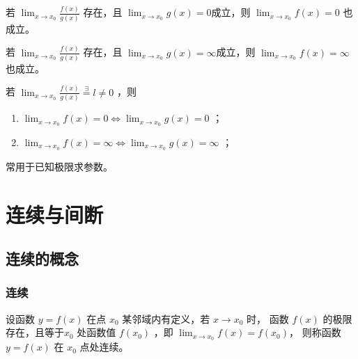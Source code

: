\begin{Field}[极限命题4]

    若 $ {\displaystyle\lim_{x\rightarrow x_0}}\frac{f(x)}{g(x)} $ 存在，且
    $ {\displaystyle\lim_{x\rightarrow x_0}}g(x)=0 $成立，则
    $ {\displaystyle\lim_{x\rightarrow x_0}}f(x)=0 $ 也成立。
\end{Field}


\begin{Field}[极限命题4推论]

    若 $ {\displaystyle\lim_{x\rightarrow x_0}}\frac{f(x)}{g(x)} $ 存在，且
    $ {\displaystyle\lim_{x\rightarrow x_0}}g(x)=\infty $成立，则
    $ {\displaystyle\lim_{x\rightarrow x_0}}f(x)=\infty $ 也成立。
\end{Field}

\begin{Field}[极限命题5]

    若 $ {\displaystyle\lim_{x\rightarrow x_0}}\frac{f(x)}{g(x)}\mathop{=}\limits^\exists l \neq 0 $ ，则
    \begin{enumerate}
        \item $ {\displaystyle\lim_{x\rightarrow x_0}}f(x)=0\Leftrightarrow {\displaystyle\lim_{x\rightarrow x_0}} g(x)=0 $ ；
        \item $ {\displaystyle\lim_{x\rightarrow x_0}}f(x)=\infty\Leftrightarrow {\displaystyle\lim_{x\rightarrow x_0}} g(x)=\infty $ ；
    \end{enumerate}
\end{Field}

常用于已知极限求参数。


\section{连续与间断}

\subsection{连续的概念}

\subsubsection{连续}

\begin{Def}[连续]

    设函数 $ y=f(x) $ 在点 $ x_0 $ 某邻域内有定义，若 $ x\rightarrow x_0 $ 时，
    函数 $ f(x) $ 的极限存在，且等于$ x_0 $ 处函数值 $ f(x_0) $ ，即 $ {\displaystyle\lim_{x\rightarrow x_0}}f(x)=f(x_0) $，
    则称函数 $ y=f(x) $ 在 $ x_0 $ 点处连续。
\end{Def}

